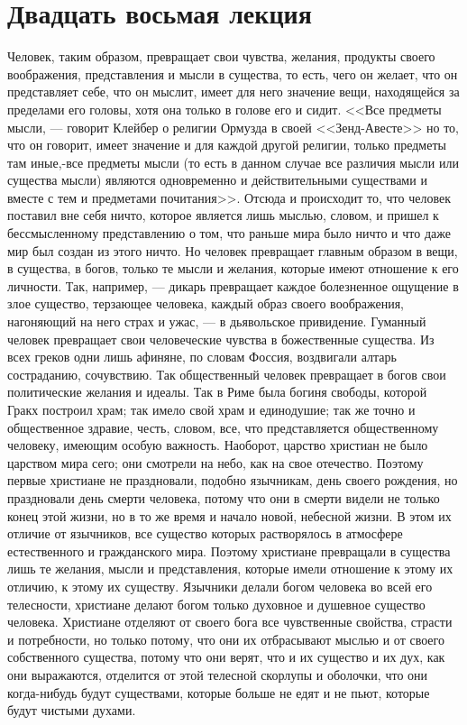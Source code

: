 \documentclass[12pt]{article}
\begin{document}
\section*{Двадцать восьмая лекция}

Человек, таким образом, превращает свои чувства, желания, продукты своего воображения, представления и мысли в существа, то есть, чего он желает, что он представляет себе, что он мыслит, имеет для него значение вещи, находящейся за пределами его головы, хотя она только в голове его и сидит. <<Все предметы мысли, --- говорит Клейбер о религии Ормузда в своей <<Зенд-Авесте>>  но то, что он говорит, имеет значение и для каждой другой религии, только предметы там иные,-все предметы мысли (то есть в данном случае все различия мысли или существа мысли) являются одновременно и действительными существами и вместе с тем и предметами почитания>>. Отсюда и происходит то, что человек поставил вне себя ничто, которое является лишь мыслью, словом, и пришел к бессмысленному представлению о том, что раньше мира было ничто и что даже мир был создан из этого ничто. Но человек превращает главным образом в вещи, в существа, в богов, только те мысли и желания, которые имеют отношение к его личности. Так, например, --- дикарь превращает каждое болезненное ощущение в злое существо, терзающее человека, каждый образ своего воображения, нагоняющий на него страх и ужас, --- в дьявольское привидение. Гуманный человек превращает свои человеческие чувства в божественные существа. Из всех греков одни лишь афиняне, по словам Фоссия, воздвигали алтарь состраданию, сочувствию. Так общественный человек превращает в богов свои политические желания и идеалы. Так в Риме была богиня свободы, которой Гракх построил храм; так имело свой храм и единодушие; так же точно и общественное здравие, честь, словом, все, что представляется общественному человеку, имеющим особую важность. Наоборот, царство христиан не было царством мира сего; они смотрели на небо, как на свое отечество. Поэтому первые христиане не праздновали, подобно язычникам, день своего рождения, но праздновали день смерти человека, потому что они в смерти видели не только конец этой жизни, но в то же время и начало новой, небесной жизни. В этом их отличие от язычников, все существо которых растворялось в атмосфере естественного и гражданского мира. Поэтому христиане превращали в существа лишь те желания, мысли и представления, которые имели отношение к этому их отличию, к этому их существу. Язычники делали богом человека во всей его телесности, христиане делают богом только духовное и душевное существо человека. Христиане отделяют от своего бога все чувственные свойства, страсти и потребности, но только потому, что они их отбрасывают мыслью и от своего собственного существа, потому что они верят, что и их существо и их дух, как они выражаются, отделится от этой телесной скорлупы и оболочки, что они когда-нибудь будут существами, которые больше не едят и не пьют, которые будут чистыми духами. 
\end{document}
